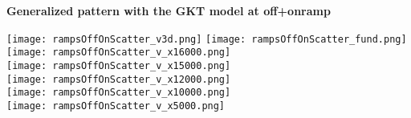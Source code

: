 \documentclass[a4paper,12pt]{scrartcl}
\begin{document}
\begin{center}

{\Large\sf\textbf{Generalized pattern with the GKT model at off+onramp}}


\hspace*{-40mm}
\texttt{[image: rampsOffOnScatter\_v3d.png]}
\hspace*{-5mm}
\texttt{[image: rampsOffOnScatter\_fund.png]}
\texttt{[image: rampsOffOnScatter\_v\_x16000.png]} \\[-2mm]
\texttt{[image: rampsOffOnScatter\_v\_x15000.png]} \\[-2mm]
\texttt{[image: rampsOffOnScatter\_v\_x12000.png]} \\[-2mm]
\texttt{[image: rampsOffOnScatter\_v\_x10000.png]} \\[-2mm]
\texttt{[image: rampsOffOnScatter\_v\_x5000.png]}
\end{center}





\end{document}
